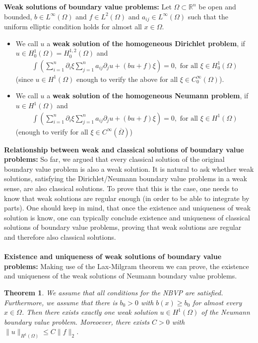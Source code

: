 \documentclass[11pt,a4paper]{article}
\newtheorem{thm}{Theorem}[section]
\theoremstyle{definition}
\begin{document}
\textbf{Weak solutions of boundary value problems:} Let $\Omega \subset \mathbb{R}^n$ be open and bounded, $b \in L^\infty ( \Omega)$ and $f \in L^2( \Omega)$ and $a_{ij} \in L^\infty( \Omega)$ such that the uniform elliptic condition holds for almost all $x \in \Omega$. 
\begin{itemize}
\item We call $u$ a \textbf{weak solution of the homogeneous Dirichlet problem}, if $u \in H_0^1( \Omega)=H_0^{1,2}(\Omega)$ and 
\begin{align*}
\int \left( \sum_{i=1}^n \partial_i \xi \sum_{j=1}^n a_{ij} \partial_j u + (bu+f) \xi \right)=0, \text{ for all } \xi \in H_0^1( \Omega)
\end{align*}
(since $u \in H^1( \Omega)$ enough to verify the above for all $\xi \in C_0^\infty ( \Omega)$).
\item We call $u$ a \textbf{weak solution of the homogeneous Neumann problem}, if $u \in H^1( \Omega)$ and 
\begin{align*}
\int \left( \sum_{i=1}^n \partial_i \xi \sum_{j=1}^n a_{ij} \partial_j u + (bu+f) \xi \right) =0, \text{ for all } \xi \in H^1( \Omega)
\end{align*}
(enough to verify for all $\xi \in C^\infty( \overline{\Omega})$)
\end{itemize}
\newpage
\textbf{Relationship between weak and classical solutions of boundary value problems:} So far, we argued that every classical solution of the original boundary value problem is also a weak solution. It is natural to ask whether weak solutions, satisfying the Dirichlet/Neumann boundary value problems in a weak sense, are also classical solutions. To prove that this is the case, one needs to know that weak solutions are regular enough (in order to be able to integrate by parts). One should keep in mind, that once the existence and uniqueness of weak solution is know, one can typically conclude existence and uniqueness of classical solutions of boundary value problems, proving that weak solutions are regular and therefore also classical solutions. 
\\\\
\textbf{Existence and uniqueness of weak solutions of boundary value problems:} Making use of the Lax-Milgram theorem we can prove, the existence and uniqueness of the weak solutions of Neumann boundary value problems. 
\begin{thm} We assume that all conditions for the NBVP are satisfied. Furthermore, we assume that there is $b_0 >0$ with $b(x) \geq b_0$ for almost every $x \in \Omega$. Then there exists exactly one weak solution $u \in H^1( \Omega)$ of the Neumann boundary value problem. Moreoever, there exists $C>0$ with $\|u\|_{H^1( \Omega)} \leq C \|f \|_2$. 
\end{thm}
\end{document}
